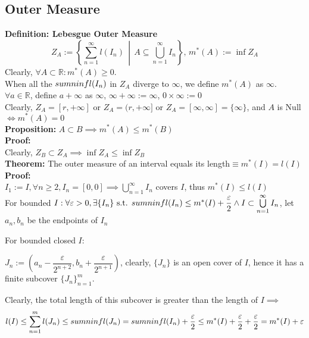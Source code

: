 \documentclass{article}
\newcommand{\R}{\mathbb{R}}
\newcommand{\sumninf}{\sum\limits_{n=1}^\infty}
\newcommand{\infcup}{\bigcup\limits_{n=1}^\infty}
\newcommand{\st}{\mbox{ s.t. }}
\newcommand{\0}{{\bf{0}}}
\newcommand{\1}{{\bf{1}}}
\begin{document}
\subsection{Outer Measure}
\textbf{Definition: Lebesgue Outer Measure}
$$Z_A:=\left\{\sum_{n=1}^\infty l(I_n)\,\middle\vert\,A\subseteq\bigcup_{n=1}^\infty I_n\right\},\,m^*(A):=\inf Z_A$$
Clearly, $\forall A\subset\R:m^*(A)\geq0$.\\
When all the $\\sumninf l(I_n)$ in $Z_A$ diverge to $\infty$, we define $m^*(A)$ as $\infty$.\\
$\forall a\in\R$, define $a+\infty$ as $\infty$, $\infty+\infty:=\infty$, $0\times\infty:=0$\\
Clearly, $Z_A=[r,+\infty]$ or $Z_A=(r,+\infty]$ or $Z_A=[\infty,\infty]=\{\infty\}$, and $A$ is Null$\iff m^*(A)=0$\\
\textbf{Proposition:}
$A\subset B\implies m^*(A)\le m^*(B)$\\
\textbf{Proof:}\\
Clearly, $Z_B\subset Z_A\implies\inf Z_A\le\inf Z_B$\\
\textbf{Theorem:} The outer measure of an interval equals its length$\equiv m^*(I)=l(I)$\\
\textbf{Proof:}\\
$I_1:=I,\forall n\geq2,I_n=[0,0]\implies\bigcup\limits_{n=1}^\infty I_n$ covers $I$, thus $m^*(I)\le l(I)$\\
For bounded $I:\forall\varepsilon>0,\exists\{I_n\}\st\\sumninf l(I_n)\le m^*(I)+\dfrac{\varepsilon}{2}\land I\subset\infcup I_n$, let $a_n,b_n$ be the endpoints of $I_n$

For bounded closed $I$:

$J_n:=\left(a_n-\dfrac{\varepsilon}{2^{n+2}},b_n+\dfrac{\varepsilon}{2^{n+1}}\right)$, clearly, $\{J_n\}$ is an open cover of $I$, hence it has a finite subcover $\{J_n\}_{n=1}^m$.

Clearly, the total length of this subcover is greater than the length of $I\implies$\\
$$l(I)\le\sum\limits_{n=1}^m l(J_n)\le\\sumninf l(J_n)=\\sumninf l(I_n)+\dfrac{\varepsilon}{2}\le m^*(I)+\dfrac{\varepsilon}{2}+\dfrac{\varepsilon}{2}=m^*(I)+\varepsilon$$
\end{document}
